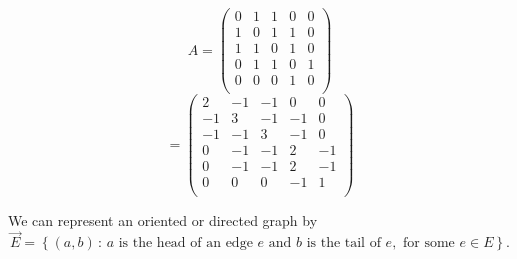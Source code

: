 $$ A = \begin{pmatrix}
     0    &     1    &     1    &     0    &     0    \\
     1    &     0    &     1    &     1    &     0    \\
     1    &     1    &     0    &     1    &     0    \\
     0    &     1    &     1    &     0    &     1    \\
     0    &     0    &     0    &     1    &     0    \\
\end{pmatrix}$$
$$= \begin{pmatrix}
     2    &    -1    &    -1    &     0    &     0    \\
    -1    &     3    &    -1    &    -1    &     0    \\
    -1    &    -1    &     3    &    -1    &     0    \\
     0    &    -1    &    -1    &     2    &    -1    \\
     0    &    -1    &    -1    &     2    &    -1    \\
     0    &     0    &     0    &    -1    &     1    \\
\end{pmatrix}$$

We can represent an oriented or directed graph by
$$\overrightarrow{E} = \left\{ (a,b) \, : \, a
\text{ is the head of an edge } e \text{ and }
b \text{ is the tail of } e, 
\text{ for some } e \in E \right\}.$$

